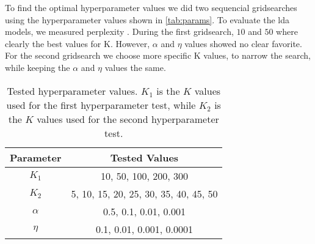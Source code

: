 To find the optimal hyperparameter values we did two sequencial gridsearches using the hyperparameter values shown in \autoref{tab:params}.
To evaluate the \gls{lda} models, we measured perplexity .
During the first gridsearch, $10$ and $50$ where clearly the best values for K.
However, $\alpha$ and $\eta$ values showed no clear favorite.
For the second gridsearch we choose more specific K values, to narrow the search, while keeping the $\alpha$ and $\eta$ values the same.

\begin{table}[h]
	\centering
	\begin{tabular}{c|c}
		Parameter & Tested Values\\
		\hline
		$K_1$ & 10, 50, 100, 200, 300\\
		$K_2$ & 5, 10, 15, 20, 25, 30, 35, 40, 45, 50\\
		$\alpha$ & 0.5, 0.1, 0.01, 0.001\\
		$\eta$ & 0.1, 0.01, 0.001, 0.0001\\
	\end{tabular}
	\caption{Tested hyperparameter values. $K_1$ is the $K$ values used for the first hyperparameter test, while $K_2$ is the $K$ values used for the second hyperparameter test.}
	\label{tab:params}
\end{table}
